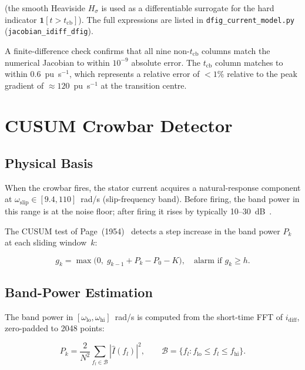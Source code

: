 \documentclass[11pt,a4paper]{article}
\newcommand{\omegas}{\omega_{\text{slip}}}
\newcommand{\tcb}{t_{\text{cb}}}
\newcommand{\Hp}{H_\sigma}
\begin{document}
(the smooth Heaviside $\Hp$ is used as a differentiable surrogate for the
hard indicator $\mathbf{1}[t > \tcb]$).
The full expressions are listed in \texttt{dfig\_current\_model.py}
(\texttt{jacobian\_idiff\_dfig}).

A finite-difference check confirms that all nine non-$\tcb$ columns match the
numerical Jacobian to within $10^{-9}$ absolute error.  The $\tcb$ column
matches to within $0.6$~pu~s$^{-1}$, which represents a relative error of
$<1\%$ relative to the peak gradient of $\approx 120$~pu~s$^{-1}$ at the
transition centre.

\section{CUSUM Crowbar Detector}
\label{sec:cusum}

\subsection{Physical Basis}

When the crowbar fires, the stator current acquires a natural-response
component at $\omegas\in[9.4, 110]$~rad/s (slip-frequency band).  Before
firing, the band power in this range is at the noise floor; after firing it
rises by typically 10--30~dB~\cite{Pannell2013}.

The CUSUM test of Page~(1954)~\cite{Page1954} detects a step increase in the
band power $P_k$ at each sliding window~$k$:

\begin{equation}
  g_k = \max\!\bigl(0,\; g_{k-1} + P_k - P_0 - K\bigr), \quad
  \text{alarm if } g_k \geq h.
  \label{eq:cusum}
\end{equation}

\subsection{Band-Power Estimation}

The band power in $[\omega_{\text{lo}},\omega_{\text{hi}}]$~rad/s is computed
from the short-time FFT of $i_{\text{diff}}$, zero-padded to 2048 points:

\begin{equation}
  P_k = \frac{2}{N^2}\sum_{f_l \in \mathcal{B}}
        \left|\hat{I}(f_l)\right|^2,
  \qquad
  \mathcal{B} = \{f_l : f_{\text{lo}} \leq f_l \leq f_{\text{hi}}\}.
\end{equation}
\end{document}
